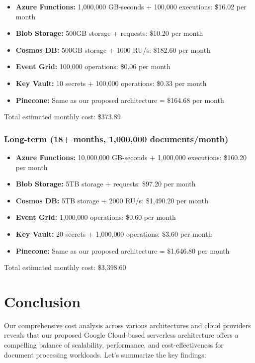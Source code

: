 \documentclass[a4paper, 12pt]{report}
\begin{document}
\begin{itemize}
    \item \textbf{Azure Functions:} 1,000,000 GB-seconds + 100,000 executions: \$16.02 per month
    \item \textbf{Blob Storage:} 500GB storage + requests: \$10.20 per month
    \item \textbf{Cosmos DB:} 500GB storage + 1000 RU/s: \$182.60 per month
    \item \textbf{Event Grid:} 100,000 operations: \$0.06 per month
    \item \textbf{Key Vault:} 10 secrets + 100,000 operations: \$0.33 per month
    \item \textbf{Pinecone:} Same as our proposed architecture = \$164.68 per month
\end{itemize}

Total estimated monthly cost: \$373.89

\subsubsection{Long-term (18+ months, 1,000,000 documents/month)}

\begin{itemize}
    \item \textbf{Azure Functions:} 10,000,000 GB-seconds + 1,000,000 executions: \$160.20 per month
    \item \textbf{Blob Storage:} 5TB storage + requests: \$97.20 per month
    \item \textbf{Cosmos DB:} 5TB storage + 2000 RU/s: \$1,490.20 per month
    \item \textbf{Event Grid:} 1,000,000 operations: \$0.60 per month
    \item \textbf{Key Vault:} 20 secrets + 1,000,000 operations: \$3.60 per month
    \item \textbf{Pinecone:} Same as our proposed architecture = \$1,646.80 per month
\end{itemize}

Total estimated monthly cost: \$3,398.60

\section{Conclusion}

Our comprehensive cost analysis across various architectures and cloud providers reveals that our proposed Google Cloud-based serverless architecture offers a compelling balance of scalability, performance, and cost-effectiveness for document processing workloads. Let's summarize the key findings:
\end{document}

